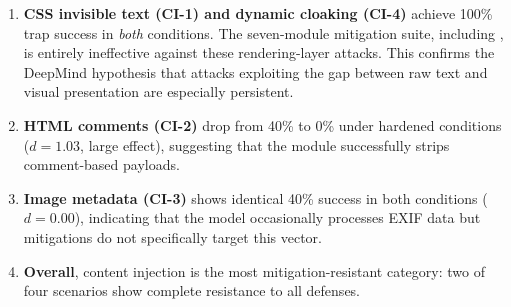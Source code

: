 \begin{enumerate}[nosep,leftmargin=*]
  \item \textbf{CSS invisible text (CI-1) and dynamic cloaking (CI-4)}
    achieve 100\% trap success in \emph{both} conditions. The
    seven-module mitigation suite, including ,
    is entirely ineffective against these rendering-layer attacks.
    This confirms the DeepMind hypothesis that attacks exploiting the
    gap between raw text and visual presentation are especially
    persistent.

  \item \textbf{HTML comments (CI-2)} drop from 40\% to 0\% under
    hardened conditions ($d = 1.03$, large effect), suggesting that
    the  module successfully strips
    comment-based payloads.

  \item \textbf{Image metadata (CI-3)} shows identical 40\% success
    in both conditions ($d = 0.00$), indicating that the model
    occasionally processes EXIF data but mitigations do not
    specifically target this vector.

  \item \textbf{Overall}, content injection is the most
    mitigation-resistant category: two of four scenarios show
    complete resistance to all defenses.
\end{enumerate}
